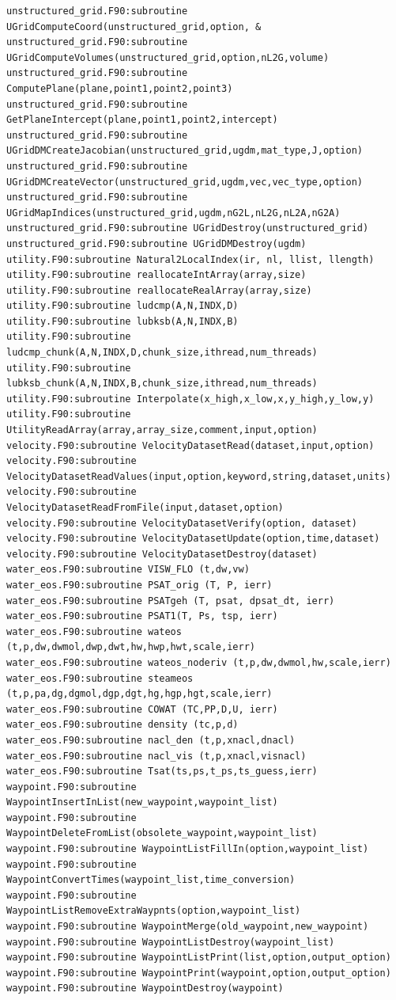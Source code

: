 \documentclass[12pt]{article}
\begin{document}
\begin{verbatim}
unstructured_grid.F90:subroutine UGridComputeCoord(unstructured_grid,option, &
unstructured_grid.F90:subroutine UGridComputeVolumes(unstructured_grid,option,nL2G,volume)
unstructured_grid.F90:subroutine ComputePlane(plane,point1,point2,point3)
unstructured_grid.F90:subroutine GetPlaneIntercept(plane,point1,point2,intercept)
unstructured_grid.F90:subroutine UGridDMCreateJacobian(unstructured_grid,ugdm,mat_type,J,option)
unstructured_grid.F90:subroutine UGridDMCreateVector(unstructured_grid,ugdm,vec,vec_type,option)
unstructured_grid.F90:subroutine UGridMapIndices(unstructured_grid,ugdm,nG2L,nL2G,nL2A,nG2A)
unstructured_grid.F90:subroutine UGridDestroy(unstructured_grid)
unstructured_grid.F90:subroutine UGridDMDestroy(ugdm)
utility.F90:subroutine Natural2LocalIndex(ir, nl, llist, llength)
utility.F90:subroutine reallocateIntArray(array,size)
utility.F90:subroutine reallocateRealArray(array,size)
utility.F90:subroutine ludcmp(A,N,INDX,D)
utility.F90:subroutine lubksb(A,N,INDX,B)
utility.F90:subroutine ludcmp_chunk(A,N,INDX,D,chunk_size,ithread,num_threads)
utility.F90:subroutine lubksb_chunk(A,N,INDX,B,chunk_size,ithread,num_threads)
utility.F90:subroutine Interpolate(x_high,x_low,x,y_high,y_low,y)
utility.F90:subroutine UtilityReadArray(array,array_size,comment,input,option)
velocity.F90:subroutine VelocityDatasetRead(dataset,input,option)
velocity.F90:subroutine VelocityDatasetReadValues(input,option,keyword,string,dataset,units)
velocity.F90:subroutine VelocityDatasetReadFromFile(input,dataset,option)
velocity.F90:subroutine VelocityDatasetVerify(option, dataset)
velocity.F90:subroutine VelocityDatasetUpdate(option,time,dataset)
velocity.F90:subroutine VelocityDatasetDestroy(dataset)
water_eos.F90:subroutine VISW_FLO (t,dw,vw)
water_eos.F90:subroutine PSAT_orig (T, P, ierr)
water_eos.F90:subroutine PSATgeh (T, psat, dpsat_dt, ierr)
water_eos.F90:subroutine PSAT1(T, Ps, tsp, ierr)
water_eos.F90:subroutine wateos (t,p,dw,dwmol,dwp,dwt,hw,hwp,hwt,scale,ierr)
water_eos.F90:subroutine wateos_noderiv (t,p,dw,dwmol,hw,scale,ierr)
water_eos.F90:subroutine steameos (t,p,pa,dg,dgmol,dgp,dgt,hg,hgp,hgt,scale,ierr)
water_eos.F90:subroutine COWAT (TC,PP,D,U, ierr)
water_eos.F90:subroutine density (tc,p,d)
water_eos.F90:subroutine nacl_den (t,p,xnacl,dnacl)
water_eos.F90:subroutine nacl_vis (t,p,xnacl,visnacl)
water_eos.F90:subroutine Tsat(ts,ps,t_ps,ts_guess,ierr)
waypoint.F90:subroutine WaypointInsertInList(new_waypoint,waypoint_list)
waypoint.F90:subroutine WaypointDeleteFromList(obsolete_waypoint,waypoint_list)
waypoint.F90:subroutine WaypointListFillIn(option,waypoint_list)
waypoint.F90:subroutine WaypointConvertTimes(waypoint_list,time_conversion)
waypoint.F90:subroutine WaypointListRemoveExtraWaypnts(option,waypoint_list)
waypoint.F90:subroutine WaypointMerge(old_waypoint,new_waypoint)
waypoint.F90:subroutine WaypointListDestroy(waypoint_list)
waypoint.F90:subroutine WaypointListPrint(list,option,output_option)
waypoint.F90:subroutine WaypointPrint(waypoint,option,output_option)
waypoint.F90:subroutine WaypointDestroy(waypoint)
\end{verbatim} 
\end{document}
